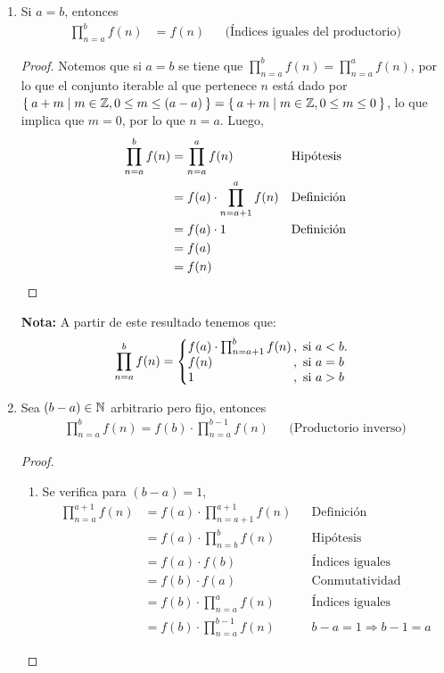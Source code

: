 \begin{enumerate}[label=\alph*)]
  \item Si $a=b$, entonces
  \begin{align*}
    \prod_{n=a}^{b} f(n) &= f(n) && \text{(Índices iguales del productorio)}
  \end{align*}
  
  \begin{proof}\leavevmode
    Notemos que si $a=b$ se tiene que $\prod_{n=a}^{b} f(n) = \prod_{n=a}^{a} f(n)$, por lo que el conjunto iterable al que pertenece $n$ está dado por $\Set{a+m|m\in \mathbb{Z}, 0\leq m\leq (a-a)}=\Set{a+m|m\in \mathbb{Z}, 0\leq m\leq 0}$, lo que implica que $m=0$, por lo que $n=a$. Luego,
    \begin{align*}
      \prod_{n=a}^{b} f(n) &= \prod_{n=a}^{a} f(n) && \text{Hipótesis}\\
      &= f(a) \cdot \prod_{n=a+1}^{a} f(n) && \text{Definición}\\
      &= f(a) \cdot 1 && \text{Definición}\\
      &= f(a)\\
      &= f(n) && \qedhere
    \end{align*}
  \end{proof}

  \textbf{Nota:} A partir de este resultado tenemos que:
  \[
    \prod_{n=a}^{b} f(n) = \left\{
    \begin{array}{@{}l@{\thinspace}l}
    f(a) \cdot \prod_{n=a+1}^{b} f(n) &,  \ \text{si}  \ a<b.\\
    f(n) &,  \ \text{si}  \ a=b\\
    1 &,  \ \text{si}  \ a>b
    \end{array} \right. \]
    
    \item Sea $(b-a)\in \mathbb{N}$ arbitrario pero fijo, entonces
    \begin{align*}
      \prod_{n=a}^{b} f(n) = f(b) \cdot \prod_{n=a}^{b-1} f(n) && \text{(Productorio inverso)}
    \end{align*}

    \begin{proof}\leavevmode
      \begin{enumerate}[label=\Roman*)]
          \item Se verifica para $(b-a)=1$,
          \begin{align*}
            \prod_{n=a}^{a+1} f(n) &= f(a) \cdot \prod_{n=a+1}^{a+1} f(n) && \text{Definición}\\
            &= f(a) \cdot \prod_{n=b}^{b} f(n) && \text{Hipótesis}\\
            &= f(a) \cdot f(b) && \text{Índices iguales}\\
            &= f(b) \cdot f(a) && \text{Conmutatividad}\\
            &= f(b) \cdot \prod_{n=a}^{a} f(n) && \text{Índices iguales}\\
            &= f(b) \cdot \prod_{n=a}^{b-1} f(n) && \text{$b-a=1 \Rightarrow b-1=a$}
          \end{align*}


\end{enumerate}
\end{proof}
\end{enumerate}

